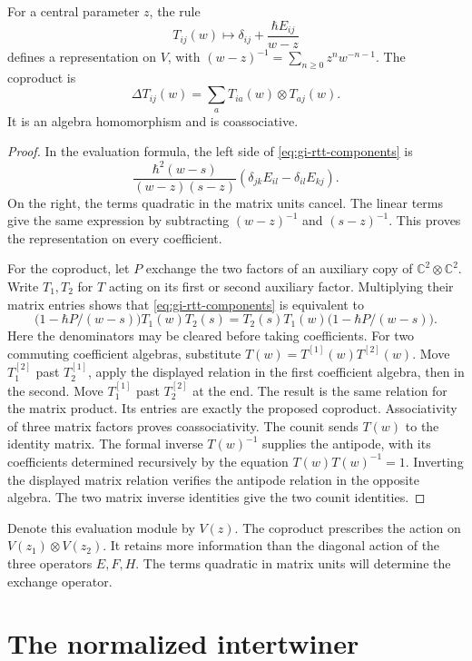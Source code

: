 \begin{lemma}\label{lem:gi-evaluation-coproduct}
For a central parameter $z$, the rule
\[
 T_{ij}(w)\longmapsto\delta_{ij}+\frac{\hbar E_{ij}}{w-z}
\]
defines a representation on $V$, with $(w-z)^{-1}=\sum_{n\geq0}z^nw^{-n-1}$.
The coproduct is
\[
 \Delta T_{ij}(w)=\sum_a T_{ia}(w)\otimes T_{aj}(w).
\]
It is an algebra homomorphism and is coassociative.
\end{lemma}
\begin{proof}
In the evaluation formula, the left side of \eqref{eq:gi-rtt-components} is
\[
 \frac{\hbar^2(w-s)}{(w-z)(s-z)}
       (\delta_{jk}E_{il}-\delta_{il}E_{kj}).
\]
On the right, the terms quadratic in the matrix units cancel.
The linear terms give the same expression by subtracting $(w-z)^{-1}$ and $(s-z)^{-1}$.
This proves the representation on every coefficient.

For the coproduct, let $P$ exchange the two factors of an auxiliary copy of $\mathbb C^2\otimes\mathbb C^2$.
Write $T_1,T_2$ for $T$ acting on its first or second auxiliary factor.
Multiplying their matrix entries shows that \eqref{eq:gi-rtt-components} is equivalent to
\[
 \bigl(1-\hbar P/(w-s)\bigr)T_1(w)T_2(s)
 =T_2(s)T_1(w)\bigl(1-\hbar P/(w-s)\bigr).
\]
Here the denominators may be cleared before taking coefficients.
For two commuting coefficient algebras, substitute $T(w)=T^{[1]}(w)T^{[2]}(w)$.
Move $T^{[2]}_1$ past $T^{[1]}_2$, apply the displayed relation in the first coefficient algebra, then in the second.
Move $T^{[1]}_1$ past $T^{[2]}_2$ at the end.
The result is the same relation for the matrix product.
Its entries are exactly the proposed coproduct.
Associativity of three matrix factors proves coassociativity.
The counit sends $T(w)$ to the identity matrix.
The formal inverse $T(w)^{-1}$ supplies the antipode, with its coefficients determined recursively by the equation $T(w)T(w)^{-1}=1$.
Inverting the displayed matrix relation verifies the antipode relation in the opposite algebra.
The two matrix inverse identities give the two counit identities.
\end{proof}

Denote this evaluation module by $V(z)$.
The coproduct prescribes the action on $V(z_1)\otimes V(z_2)$.
It retains more information than the diagonal action of the three operators $E,F,H$.
The terms quadratic in matrix units will determine the exchange operator.

\section{The normalized intertwiner}

